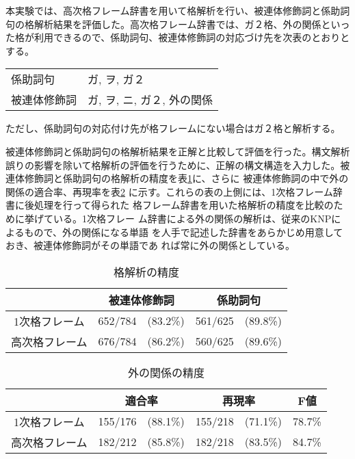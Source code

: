 \documentclass[fleqn]{nlp}
\begin{document}
本実験では、高次格フレーム辞書を用いて格解析を行い、被連体修飾詞と係助詞
句の格解析結果を評価した。高次格フレーム辞書では、ガ２格、外の関係といっ
た格が利用できるので、係助詞句、被連体修飾詞の対応づけ先を次表のとおりと
する。
\begin{center}
 \begin{tabular}{l@{ : }l} \hline
  係助詞句 & ガ, ヲ, ガ２ \\
  被連体修飾詞 & ガ, ヲ, ニ, ガ２, 外の関係 \\ \hline
 \end{tabular}
\end{center}
ただし、係助詞句の対応付け先が格フレームにない場合はガ２格と解析する。

被連体修飾詞と係助詞句の格解析結果を正解と比較して評価を行った。構文解析
誤りの影響を除いて格解析の評価を行うために、正解の構文構造を入力した。被
連体修飾詞と係助詞句の格解析の精度を表\ref{結果::格解析の精度}に、さらに
被連体修飾詞の中で外の関係の適合率、再現率を表\ref{結果::外の関係の精度} 
に示す。これらの表の上側には、1次格フレーム辞書に後処理を行って得られた
格フレーム辞書を用いた格解析の精度を比較のために挙げている。1次格フレー
ム辞書による外の関係の解析は、従来のKNPによるもので、外の関係になる単語
を人手で記述した辞書をあらかじめ用意しておき、被連体修飾詞がその単語であ
れば常に外の関係としている。

\floatsep=2pt
\begin{table}[t]
 \begin{center}
  \caption{格解析の精度}

  \vspace*{1ex}

  \label{結果::格解析の精度}
  \begin{tabular}{c|c@{ }r|c@{ }r} \hline
   & \multicolumn{2}{c|}{被連体修飾詞} & \multicolumn{2}{c}{係助詞句} \\ \hline
    1次格フレーム & 652/784 & (83.2\%) & 561/625 & (89.8\%) \\
   高次格フレーム & 676/784 & (86.2\%) & 560/625 & (89.6\%) \\ \hline
  \end{tabular}
 \end{center}
\end{table}

\begin{table}[t]
 \begin{center}
  \caption{外の関係の精度}

  \vspace*{1ex}

  \label{結果::外の関係の精度}
  \begin{tabular}{c|c@{ }r|c@{ }r|r} \hline
   & \multicolumn{2}{c|}{適合率} & \multicolumn{2}{c|}{再現率} & \multicolumn{1}{c}{F値} \\ \hline
    1次格フレーム & 155/176 & (88.1\%) & 155/218 & (71.1\%) & 78.7\% \\[-3pt]
   高次格フレーム & 182/212 & (85.8\%) & 182/218 & (83.5\%) & 84.7\% \\ \hline
  \end{tabular}
 \end{center}
\end{table}
\end{document}
